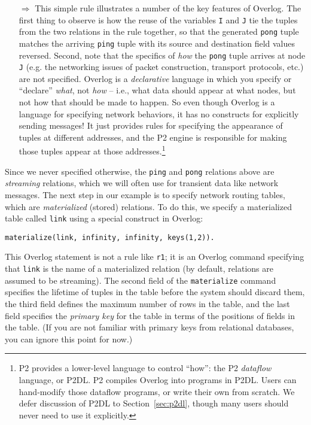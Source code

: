 \documentclass{article}
\begin{document}
\begin{itemize}
\item[$\Longrightarrow$] This simple rule illustrates a number of the
  key features of Overlog.  The first thing to observe is how the reuse
  of the variables \lstinline$I$ and \lstinline$J$ tie the tuples from
  the two relations in the rule together, so that the generated
  \lstinline$pong$ tuple matches the arriving \lstinline$ping$ tuple
  with its source and destination field values reversed.  Second, note
  that the specifics of {\em how} the \lstinline$pong$ tuple arrives at
  node \lstinline$J$ (e.g. the networking issues of packet construction,
  transport protocols, etc.)  are not specified.  Overlog is a {\em
  declarative} language in which you specify or ``declare'' {\em what},
  not {\em how} -- i.e., what data should appear at what nodes, but not
  how that should be made to happen.  So even though Overlog is a
  language for specifying network behaviors, it has no constructs for
  explicitly sending messages!  It just provides rules for specifying
  the appearance of tuples at different addresses, and the P2 engine is
  responsible for making those tuples appear at those
  addresses.\footnote{P2 provides a lower-level language to control
  ``how'': the P2 {\em dataflow} language, or P2DL.  P2 compiles Overlog
  into programs in P2DL. Users can hand-modify those dataflow programs,
  or write their own from scratch.  We defer discussion of P2DL to
  Section~\ref{sec:p2dl}, though many users should never need to use it
  explicitly.}
\end{itemize}


\noindent
Since we never specified otherwise, the \lstinline$ping$ and
\lstinline$pong$ relations above are {\em streaming} relations, which
we will often use for transient data like network messages.  The next
step in our example is to specify network routing tables, which are
{\em materialized} (stored) relations.  To do this, we specify a
materialized table called \lstinline$link$ using a special construct
in Overlog:

\begin{lstlisting}
materialize(link, infinity, infinity, keys(1,2)).
\end{lstlisting}
This Overlog statement is not a rule like \lstinline$r1$; it is an
Overlog command specifying that \lstinline$link$ is the name of a
materialized relation (by default, relations are assumed to be
streaming).  The second field of the \lstinline$materialize$ command
specifies the lifetime of tuples in the table before the system should
discard them, the third field
defines the maximum number of rows in the table,
and the last field specifies the {\em primary key} for
the table in terms of the positions of fields in the table.  (If you
are not familiar with primary keys from relational databases, you can
ignore this point for now.)
\end{document}
